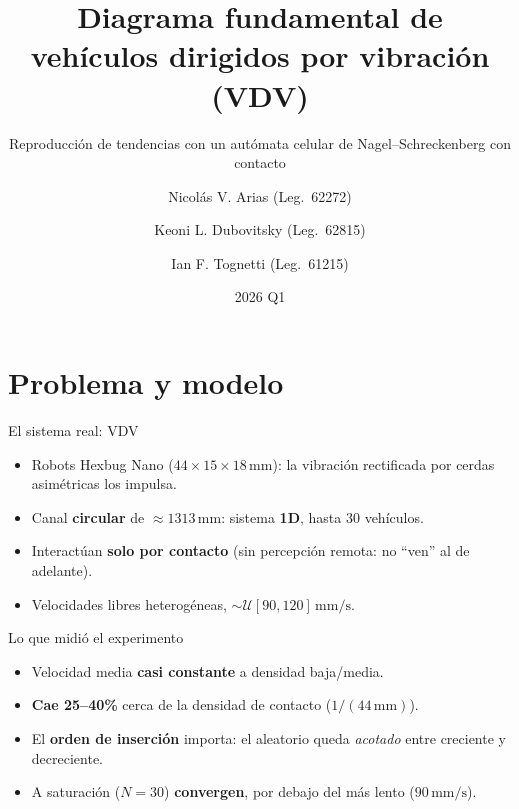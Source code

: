 \documentclass[10pt,aspectratio=169]{beamer}
\title[Diagrama fundamental de VDV]{Diagrama fundamental de vehículos dirigidos por vibración (VDV)}
\subtitle{Reproducción de tendencias con un autómata celular de Nagel--Schreckenberg con contacto}
\author[Grupo G01S2]{Nicolás V. Arias (Leg.~62272) \and Keoni L. Dubovitsky (Leg.~62815) \and Ian F. Tognetti (Leg.~61215)}
\institute[ITBA]{72.25 Simulación de Sistemas --- ITBA}
\date{2026 Q1}
\newcommand{\unit}[1]{\,\mathrm{#1}}
\begin{document}
\begin{frame}[plain]\titlepage\end{frame}

\section{Problema y modelo}

\begin{frame}{El sistema real: VDV}
\begin{itemize}
  \item Robots Hexbug Nano ($44\times15\times18\unit{mm}$): la vibración rectificada por cerdas
  asimétricas los impulsa.
  \item Canal \textbf{circular} de $\approx1313\unit{mm}$: sistema \textbf{1D}, hasta $30$ vehículos.
  \item Interactúan \textbf{solo por contacto} (sin percepción remota: no ``ven'' al de adelante).
  \item Velocidades libres heterogéneas, $\sim\mathcal{U}[90,120]\unit{mm/s}$.
\end{itemize}
\end{frame}

\begin{frame}{Lo que midió el experimento}
\begin{itemize}
  \item Velocidad media \textbf{casi constante} a densidad baja/media.
  \item \textbf{Cae 25--40\%} cerca de la densidad de contacto ($1/(44\unit{mm})$).
  \item El \textbf{orden de inserción} importa: el aleatorio queda \emph{acotado} entre creciente y decreciente.
  \item A saturación ($N=30$) \textbf{convergen}, por debajo del más lento ($90\unit{mm/s}$).
\end{itemize}
\end{frame}
\end{document}
